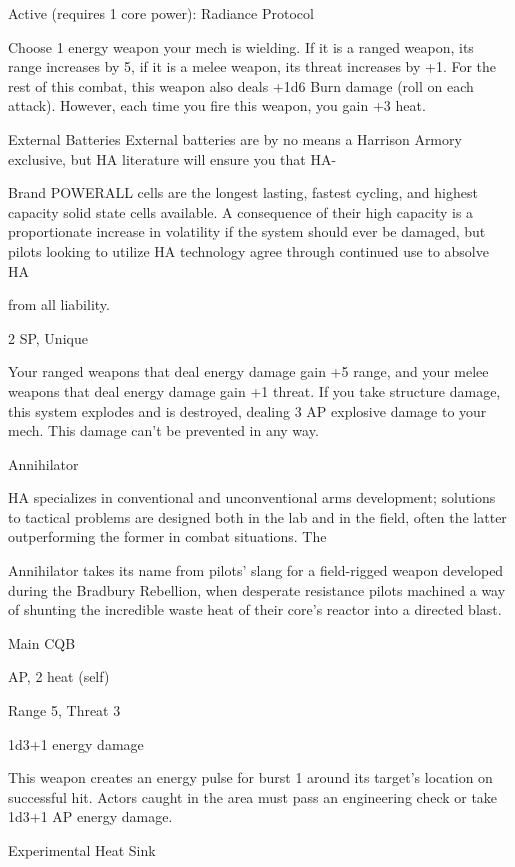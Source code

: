   Active (requires 1 core power):
  Radiance
  Protocol

  Choose 1 energy weapon your mech is wielding. If it is a ranged weapon, its range increases by 5, if it
  is a melee weapon, its threat increases by +1. For the rest of this combat, this weapon also deals +1d6
  Burn damage (roll on each attack). However, each time you fire this weapon, you gain +3 heat.

External Batteries
External batteries are by no means a Harrison Armory exclusive, but HA literature will ensure you that HA-

Brand POWERALL cells are the longest lasting, fastest cycling, and highest capacity solid state cells
available. A consequence of their high capacity is a proportionate increase in volatility if the system should
ever be damaged, but pilots looking to utilize HA technology agree through continued use to absolve HA

from all liability.

2 SP, Unique





Your ranged weapons that deal energy damage gain +5 range, and your melee weapons that
deal energy damage gain +1 threat. If you take structure damage, this system explodes and is
destroyed, dealing 3 AP explosive damage to your mech. This damage can’t be prevented in any
way.


Annihilator

HA specializes in conventional and unconventional arms development; solutions to tactical problems are
designed both in the lab and in the field, often the latter outperforming the former in combat situations. The

Annihilator takes its name from pilots’ slang for a field-rigged weapon developed during the Bradbury
Rebellion, when desperate resistance pilots machined a way of shunting the incredible waste heat of their
core’s reactor into a directed blast.

Main CQB

AP, 2 heat (self)

Range 5, Threat 3

1d3+1 energy damage

This weapon creates an energy pulse for burst 1 around its target’s location on successful hit.
Actors caught in the area must pass an engineering check or take 1d3+1 AP energy damage.


Experimental Heat Sink

